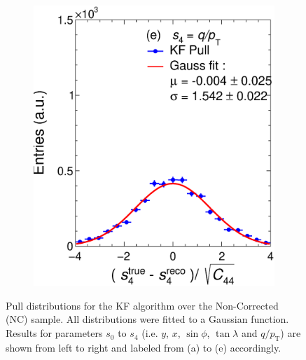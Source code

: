 \begin{figure}[t]
\begin{subfigure}{0.32\textwidth}
         \includegraphics[width=\textwidth]{figures/ch4-KF_NDGArLite/Toy/NoCorr/UnitKFEnd_p4.eps}
         \caption{}
         \label{fig:resp4KF_GArLite_NoCorr}
     \end{subfigure}
        \caption{Pull distributions for the KF algorithm over the Non-Corrected (NC) sample. All distributions were fitted to a Gaussian function. Results for parameters $s_0$ to $s_4$ (i.e. $y$, $x$, $\sin\phi$, $\tan\lambda$ and $q/p_{\text{T}}$) are shown from left to right and labeled from (a) to (e) accordingly. }
        \label{fig:ToyUnitKF_GArLite_NoCorr}
\end{figure}

